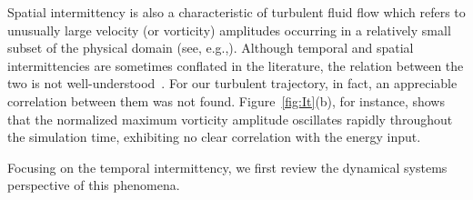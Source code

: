\documentclass{article}
\begin{document}
Spatial intermittency is
also a characteristic of turbulent fluid flow which refers to
unusually large velocity (or vorticity) amplitudes occurring in a relatively small subset of the
physical domain (see, e.g.,).
Although temporal and spatial
intermittencies are sometimes conflated in the literature,
the relation between the two
is not well-understood~\citep{gibbon03}. For our turbulent trajectory, in fact, an appreciable
correlation
between them was not found. Figure~\ref{fig:It}(b), for instance, shows
that the normalized maximum vorticity amplitude oscillates rapidly throughout the simulation
time, exhibiting no clear correlation with the energy input.

Focusing on the temporal intermittency, we first review the dynamical systems
perspective of this phenomena.
\end{document}
